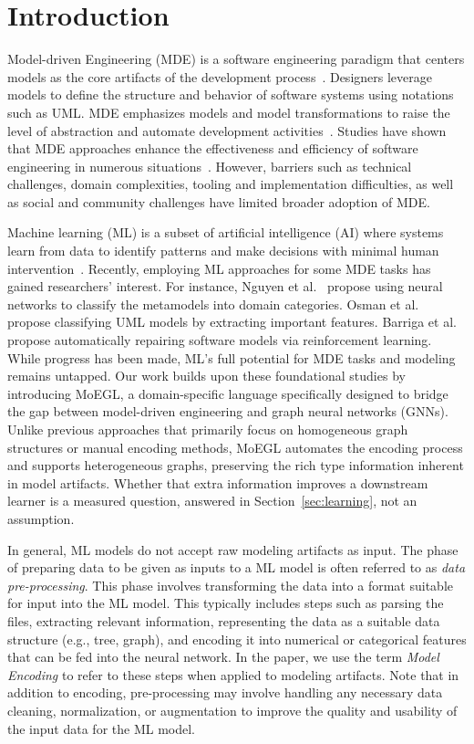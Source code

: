 \documentclass[journal,article,submit,moreauthors,technologies]{Definitions/mdpi}
\newcommand{\rev}[1]{#1}
\begin{document}
\section{Introduction}\label{sec1}
Model-driven Engineering (MDE) is a software engineering paradigm that centers models as the core artifacts of the development process~\cite{brambilla2017model}. Designers leverage models to define the structure and behavior of software systems using notations such as UML. MDE emphasizes models and model transformations to raise the level of abstraction and automate development activities~\cite{mellor2003guest}. Studies have shown that MDE approaches enhance the effectiveness and efficiency of software engineering in numerous situations~\cite{whittle2013state}. However, barriers such as technical challenges, domain complexities, tooling and implementation difficulties, as well as social and community challenges have limited broader adoption of MDE.

Machine learning (ML) is a subset of artificial intelligence (AI) where systems learn from data to identify patterns and make decisions with minimal human intervention~\cite{panat2023introduction}. Recently, employing ML approaches for some MDE tasks has gained researchers' interest. For instance, Nguyen et al.~\cite{nguyen2019automated} propose using neural networks to classify the metamodels into domain categories. Osman et al.~\cite{osman2018automated} propose classifying UML models by extracting important features. Barriga et al.~\cite{barriga2019personalized} propose automatically repairing software models via reinforcement learning. While progress has been made, ML's full potential for MDE tasks and modeling remains untapped. Our work builds upon these foundational studies by introducing MoEGL, a domain-specific language specifically designed to bridge the gap between model-driven engineering and graph neural networks (GNNs). Unlike previous approaches that primarily focus on homogeneous graph structures or manual encoding methods, MoEGL automates the encoding process and supports heterogeneous graphs, preserving the rich type information inherent in model artifacts. \rev{Whether that extra information improves a downstream learner is a measured question, answered in Section~\ref{sec:learning}, not an assumption.}

In general, ML models do not accept raw modeling artifacts as input. The phase of preparing data to be given as inputs to a ML model is often referred to as \emph{data pre-processing}. This phase involves transforming the data into a format suitable for input into the ML model. This typically includes steps such as parsing the files, extracting relevant information, representing the data as a suitable data structure (e.g., tree, graph), and encoding it into numerical or categorical features that can be fed into the neural network. In the paper, we use the term \emph{Model Encoding} to refer to these steps when applied to modeling artifacts. Note that in addition to encoding, pre-processing may involve handling any necessary data cleaning, normalization, or augmentation to improve the quality and usability of the input data for the ML model.
\end{document}
